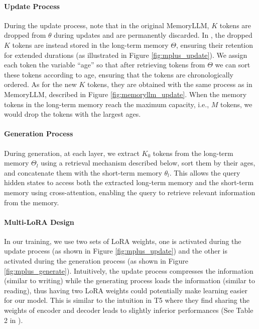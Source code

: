 \vspace{-10pt}
\paragraph{Update Process} During the update process, note that in the original MemoryLLM, $K$ tokens are dropped from $\theta$ during updates and are permanently discarded. In \ours, the dropped $K$ tokens are instead stored in the long-term memory $\Theta$, ensuring their retention for extended durations (as illustrated in Figure \ref{fig:mplus_update}). We assign each token the variable ``age'' so that after retrieving tokens from $\Theta$ we can sort these tokens according to age, ensuring that the tokens are chronologically ordered. As for the new $K$ tokens, they are obtained with the same process as in MemoryLLM, described in Figure \ref{fig:memoryllm_update}. When the memory tokens in the long-term memory reach the maximum capacity, i.e., $M$ tokens, we would drop the tokens with the largest ages.

\vspace{-10pt}
\paragraph{Generation Process} During generation, at each layer, we extract $K_0$ tokens from the long-term memory $\Theta_l$ using a retrieval mechanism described below, sort them by their ages, and concatenate them with the short-term memory $\theta_l$. This allows the query hidden states to access both the extracted long-term memory and the short-term memory using cross-attention, enabling the query to retrieve relevant information from the memory. 

\vspace{-10pt}
\paragraph{Multi-LoRA Design}
In our training, we use two sets of LoRA weights, one is activated during the update process (as shown in Figure \ref{fig:mplus_update}) and the other is activated during the generation process (as shown in Figure \ref{fig:mplus_generate}). Intuitively, the update process compresses the information (similar to writing) while the generating process loads the information (similar to reading), thus having two LoRA weights could potentially make  learning easier for our model. This is similar to the intuition in T5 where they find sharing the weights of encoder and decoder leads to slightly inferior performances (See Table 2 in \citet{T5}). 

